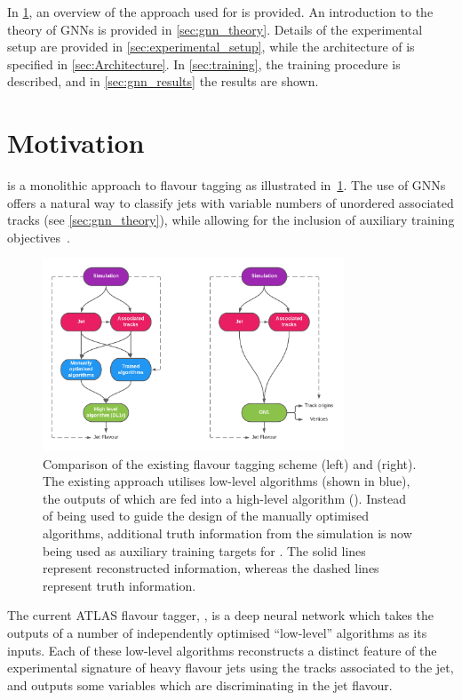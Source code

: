 In \cref{sec:gnn_motvation}, an overview of the approach used for \GNN is provided.
An introduction to the theory of GNNs is provided in \cref{sec:gnn_theory}.
Details of the experimental setup are provided in \cref{sec:experimental_setup}, while the architecture of \GNN is specified in \cref{sec:Architecture}.
In \cref{sec:training}, the training procedure is described, and in \cref{sec:gnn_results} the results are shown.

\section{Motivation}\label{sec:gnn_motvation}

\GNN is a monolithic approach to flavour tagging as illustrated in~\cref{fig:oldvsnew}.
The use of GNNs offers a natural way to classify jets with variable numbers of unordered associated tracks (see \cref{sec:gnn_theory}), while allowing for the inclusion of auxiliary training objectives~\cite{2020-gnn-for-sv,serviansky2020set2graph}.

\begin{figure}[!htbp]
    \centering
    \includegraphics[width=0.8\textwidth]{chapters/gnn_tagger/figs/GNN_compare_contrast.pdf}
    \caption{Comparison of the existing flavour tagging scheme (left) and \GNN (right). The existing approach utilises low-level algorithms (shown in blue), the outputs of which are fed into a high-level algorithm (\DLr). Instead of being used to guide the design of the manually optimised algorithms, additional truth information from the simulation is now being used as auxiliary training targets for \GNN. The solid lines represent reconstructed information, whereas the dashed lines represent truth information.}
    \label{fig:oldvsnew}
\end{figure}

The current ATLAS flavour tagger, \DLr \cite{ATL-PHYS-PUB-2017-013}, is a deep neural network which takes the outputs of a number of independently optimised ``low-level'' algorithms \cite{FTAG-2018-01} as its inputs. 
Each of these low-level algorithms reconstructs a distinct feature of the experimental signature of heavy flavour jets using the tracks associated to the jet, and outputs some variables which are discriminating in the jet flavour.

